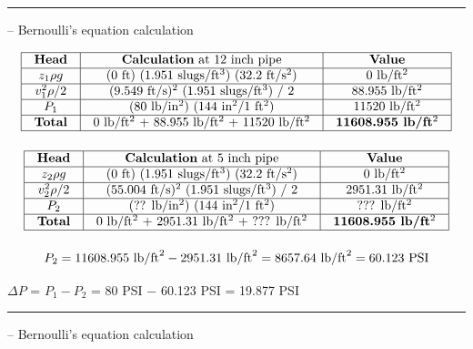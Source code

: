 \filbreak \vskip 5pt \hrule \vskip 5pt  -- Bernoulli's equation calculation \vskip 10pt


$$\vbox{\offinterlineskip
\halign{\strut
\vrule \quad\hfil # \ \hfil & 
\vrule \quad\hfil # \ \hfil & 
\vrule \quad\hfil # \ \hfil \vrule \cr
\noalign{\hrule}
%
{\bf Head} & {\bf Calculation} at 12 inch pipe & {\bf Value} \cr
%
\noalign{\hrule}
%
$z_1 \rho g$ & (0 ft) (1.951 slugs/ft$^{3}$) (32.2 ft/s$^{2}$) & 0 lb/ft$^{2}$ \cr
%
\noalign{\hrule}
%
$v_1^2 \rho / 2$ & (9.549 ft/s)$^{2}$ (1.951 slugs/ft$^{3}$) / 2 & 88.955 lb/ft$^{2}$ \cr
%
\noalign{\hrule}
%
$P_1$ & (80 lb/in$^{2}$) (144 in$^{2}$/1 ft$^{2}$) & 11520 lb/ft$^{2}$ \cr
%
\noalign{\hrule}
%
{\bf Total} &  0 lb/ft$^{2}$ + 88.955 lb/ft$^{2}$ + 11520 lb/ft$^{2}$ & {\bf 11608.955 lb/ft$^{2}$} \cr
%
\noalign{\hrule}
} %
}$$ %

\vskip 10pt


$$\vbox{\offinterlineskip
\halign{\strut
\vrule \quad\hfil # \ \hfil & 
\vrule \quad\hfil # \ \hfil & 
\vrule \quad\hfil # \ \hfil \vrule \cr
\noalign{\hrule}
%
{\bf Head} & {\bf Calculation} at 5 inch pipe & {\bf Value} \cr
%
\noalign{\hrule}
%
$z_2 \rho g$ & (0 ft) (1.951 slugs/ft$^{3}$) (32.2 ft/s$^{2}$) & 0 lb/ft$^{2}$ \cr
%
\noalign{\hrule}
%
$v_2^2 \rho / 2$ & (55.004 ft/s)$^{2}$ (1.951 slugs/ft$^{3}$) / 2 & 2951.31 lb/ft$^{2}$ \cr
%
\noalign{\hrule}
%
$P_2$ & (?? lb/in$^{2}$) (144 in$^{2}$/1 ft$^{2}$) & ??? lb/ft$^{2}$ \cr
%
\noalign{\hrule}
%
{\bf Total} &  0 lb/ft$^{2}$ + 2951.31 lb/ft$^{2}$ + ??? lb/ft$^{2}$ & {\bf 11608.955 lb/ft$^{2}$} \cr
%
\noalign{\hrule}
} %
}$$ %

$$P_2 = 11608.955 \hbox{ lb/ft}^2 - 2951.31 \hbox{ lb/ft}^2 = 8657.64 \hbox{ lb/ft}^2 = 60.123 \hbox{ PSI}$$

\vskip 10pt

$\Delta P$ = $P_1 - P_2$ = 80 PSI $-$ 60.123 PSI = 19.877 PSI


\filbreak \vskip 5pt \hrule \vskip 5pt  -- Bernoulli's equation calculation \vskip 10pt

